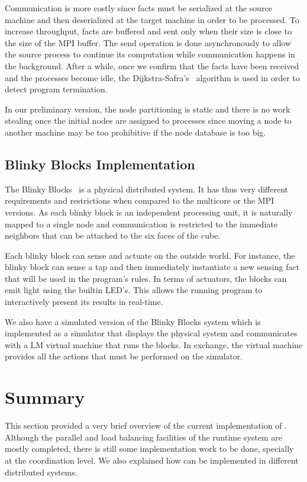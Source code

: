 Communication is more costly since facts must be serialized at the source machine and then deserialized
at the target machine in order to be processed. To increase throughput, facts are buffered and sent only when their size is close to the size of the MPI buffer.
The send operation is done asynchronously to allow the source process to continue its computation while communication happens in the background.
After a while, once we confirm that the facts have been received and the processes become idle, the Dijkstra-Safra's~\cite{safras87} algorithm
is used in order to detect program termination.

In our preliminary version, the node partitioning is static and there is no work stealing once the initial nodes are assigned to processes since
moving a node to another machine may be too prohibitive if the node database is too big.
 
\subsection{Blinky Blocks Implementation}

The Blinky Blocks~\cite{Kirby-chi11} is a physical distributed system. It has thus very different requirements and restrictions when compared to the multicore
or the MPI versions. As each blinky block is an independent processing unit, it is naturally mapped to a single node and communication is restricted
to the immediate neighbors that can be attached to the six faces of the cube.

Each blinky block can sense and actuate on the outside world. For instance, the blinky block can sense a tap and then immediately instantiate
a new sensing fact that will be used in the program's rules. In terms of actuators, the blocks can emit light using the builtin LED's.
This allows the running program to interactively present its results in real-time.

We also have a simulated version of the Blinky Blocks system which is implemented as a simulator that displays the physical system and
communicates with a LM virtual machine that runs the blocks. In exchange, the virtual machine provides all the actions that must be performed
on the simulator.

\section{Summary}

This section provided a very brief overview of the current implementation of \lang. Although the parallel and load balancing facilities of the
runtime system are mostly completed, there is still some implementation work to be done, specially at the coordination level.
We also explained how \lang can be implemented in different distributed systems.
